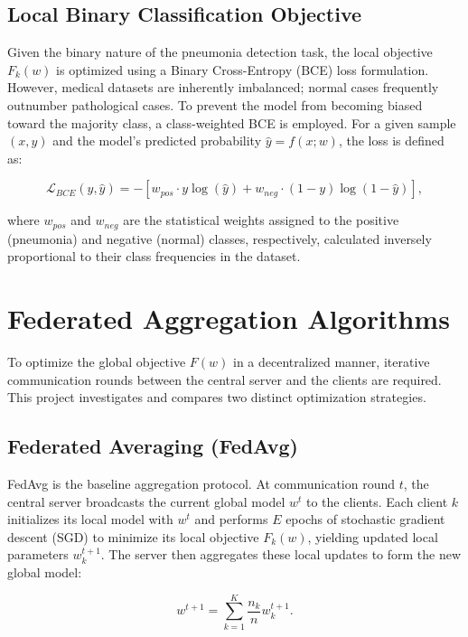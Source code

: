 \documentclass[12pt,a4paper]{report}
\begin{document}
\subsection{Local Binary Classification Objective}

Given the binary nature of the pneumonia detection task, the local objective $F_k(w)$ is optimized using a Binary Cross-Entropy (BCE) loss formulation. However, medical datasets are inherently imbalanced; normal cases frequently outnumber pathological cases. To prevent the model from becoming biased toward the majority class, a class-weighted BCE is employed. For a given sample $(x, y)$ and the model's predicted probability $\hat{y} = f(x; w)$, the loss is defined as:

\begin{equation}
\mathcal{L}_{BCE}(y, \hat{y}) = - \left[ w_{pos} \cdot y \log(\hat{y}) + w_{neg} \cdot (1-y) \log(1-\hat{y}) \right],
\end{equation}

where $w_{pos}$ and $w_{neg}$ are the statistical weights assigned to the positive (pneumonia) and negative (normal) classes, respectively, calculated inversely proportional to their class frequencies in the dataset.

\section{Federated Aggregation Algorithms}

To optimize the global objective $F(w)$ in a decentralized manner, iterative communication rounds between the central server and the clients are required. This project investigates and compares two distinct optimization strategies.

\subsection{Federated Averaging (FedAvg)}

FedAvg is the baseline aggregation protocol. At communication round $t$, the central server broadcasts the current global model $w^t$ to the clients. Each client $k$ initializes its local model with $w^t$ and performs $E$ epochs of stochastic gradient descent (SGD) to minimize its local objective $F_k(w)$, yielding updated local parameters $w_k^{t+1}$. The server then aggregates these local updates to form the new global model:

\begin{equation}
w^{t+1} = \sum_{k=1}^{K} \frac{n_k}{n} w_k^{t+1}.
\end{equation}
\end{document}
